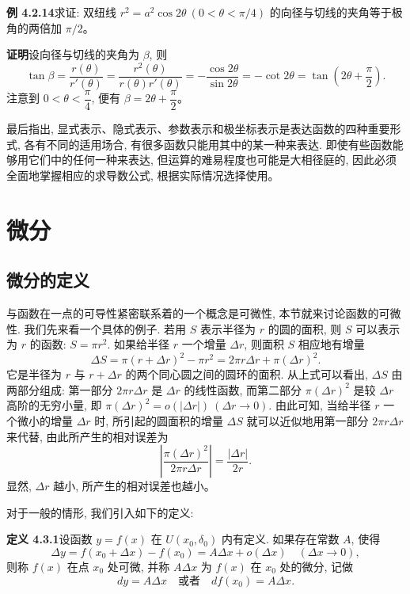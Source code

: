 \documentclass[UTF8,12pt,a4paper,fontset=fandol]{ctexart}
\begin{document}
\noindent\textbf{例 4.2.14}\quad 求证: 双纽线 $r^2=a^2\cos2\theta\ (0<\theta<\pi/4)$ 的向径与切线的夹角等于极角的两倍加 $\pi/2$。

\noindent\textbf{证明}\quad 设向径与切线的夹角为 $\beta$, 则
\[
  \tan\beta
  =
  \frac{r(\theta)}{r'(\theta)}
  =
  \frac{r^2(\theta)}{r(\theta)r'(\theta)}
  =
  -\frac{\cos2\theta}{\sin2\theta}
  =
  -\cot2\theta
  =
  \tan\left(2\theta+\frac{\pi}{2}\right).
\]
注意到 $0<\theta<\dfrac{\pi}{4}$, 便有 $\beta=2\theta+\dfrac{\pi}{2}$。

最后指出, 显式表示、隐式表示、参数表示和极坐标表示是表达函数的四种重要形式, 各有不同的适用场合, 有很多函数只能用其中的某一种来表达. 即使有些函数能够用它们中的任何一种来表达, 但运算的难易程度也可能是大相径庭的, 因此必须全面地掌握相应的求导数公式, 根据实际情况选择使用。

\section{微分}

\subsection{微分的定义}

与函数在一点的可导性紧密联系着的一个概念是可微性, 本节就来讨论函数的可微性. 我们先来看一个具体的例子. 若用 $S$ 表示半径为 $r$ 的圆的面积, 则 $S$ 可以表示为 $r$ 的函数: $S=\pi r^2$. 如果给半径 $r$ 一个增量 $\Delta r$, 则面积 $S$ 相应地有增量
\[
  \Delta S
  =
  \pi(r+\Delta r)^2-\pi r^2
  =
  2\pi r\Delta r+\pi(\Delta r)^2.
\]
它是半径为 $r$ 与 $r+\Delta r$ 的两个同心圆之间的圆环的面积. 从上式可以看出, $\Delta S$ 由两部分组成: 第一部分 $2\pi r\Delta r$ 是 $\Delta r$ 的线性函数, 而第二部分 $\pi(\Delta r)^2$ 是较 $\Delta r$ 高阶的无穷小量, 即 $\pi(\Delta r)^2=o(|\Delta r|)\ (\Delta r\to0)$. 由此可知, 当给半径 $r$ 一个微小的增量 $\Delta r$ 时, 所引起的圆面积的增量 $\Delta S$ 就可以近似地用第一部分 $2\pi r\Delta r$ 来代替, 由此所产生的相对误差为
\[
  \left|\frac{\pi(\Delta r)^2}{2\pi r\Delta r}\right|
  =
  \frac{|\Delta r|}{2r}.
\]
显然, $\Delta r$ 越小, 所产生的相对误差也越小。

对于一般的情形, 我们引入如下的定义:

\noindent\textbf{定义 4.3.1}\quad 设函数 $y=f(x)$ 在 $U(x_0,\delta_0)$ 内有定义. 如果存在常数 $A$, 使得
\[
  \Delta y=f(x_0+\Delta x)-f(x_0)=A\Delta x+o(\Delta x)
  \quad(\Delta x\to0),
\]
则称 $f(x)$ 在点 $x_0$ 处可微, 并称 $A\Delta x$ 为 $f(x)$ 在 $x_0$ 处的微分, 记做
\[
  dy=A\Delta x\quad\text{或者}\quad df(x_0)=A\Delta x.
\]
\end{document}
